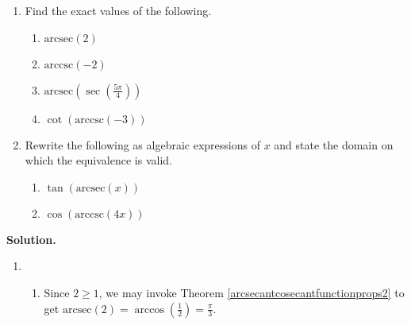 \documentclass[12pt]{ximera}
\begin{document}
\begin{example}  \label{arcsecantcosecantex2} $~$

\begin{enumerate}

\item  Find the exact values of the following.

\begin{multicols}{4}

\begin{enumerate}

\item $\mbox{arcsec}(2)$

\item  $\mbox{arccsc}(-2)$

\item  $\mbox{arcsec}\left( \sec\left( \frac{5\pi}{4} \right) \right)$

\item  $\cot\left(\mbox{arccsc}\left(-3\right)\right)$

\end{enumerate}

\end{multicols}

\enlargethispage{.25in}

\item  Rewrite the following as algebraic expressions of $x$ and state the domain on which the equivalence is valid.

\begin{multicols}{2}

\begin{enumerate}

\item  $\tan(\mbox{arcsec}(x))$

\item  $\cos(\mbox{arccsc}(4x))$ 

\end{enumerate}

\end{multicols}

\end{enumerate}

{\bf Solution.}

\begin{enumerate}
\item
\begin{enumerate}

\item  Since $2 \geq 1$, we may invoke Theorem \ref{arcsecantcosecantfunctionprops2} to get $\mbox{arcsec}(2) = \arccos\left(\frac{1}{2}\right) = \frac{\pi}{3}$.


\end{enumerate}
\end{enumerate}
\end{example}
\end{document}
